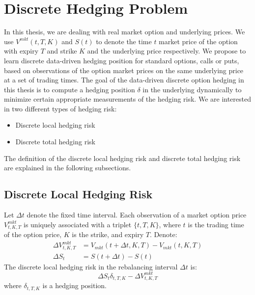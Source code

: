 \documentclass[letterpaper,12pt,titlepage,oneside,final]{book}
\numberwithin{equation}{section}
\theoremstyle{definition}
\newcommand{\DT}{\Delta t}
\newcommand{\Vmkt}{V^{mkt}}
\newcommand{\Smkt}{S}
\begin{document}
\section{Discrete Hedging Problem}
\label{sec:DiscreteHedgingCriteria}
In this thesis, we are dealing with real market option and underlying prices.  We use  $\Vmkt(t,T,K)$ and $\Smkt(t)$ to denote the time $t$ market price of the option with expiry $T$ and strike $K$ and the underlying price respectively. We propose to learn discrete data-driven hedging position for standard options, calls or puts, based on observations of the option market prices on the same underlying price at a set of trading times.
The goal of the data-driven discrete option hedging in this thesis is to compute a hedging position $\delta$ in the underlying dynamically to minimize certain appropriate measurements of the hedging risk. We are interested in two different types of hedging risk:
\begin{itemize}
   \item  Discrete local hedging risk
   \item  Discrete total hedging risk
\end{itemize}
The definition of the discrete local hedging risk and discrete total hedging risk are explained in the following subsections.

\subsection{Discrete Local Hedging Risk}
\label{sec:DiscreteLocalRisk}
 Let $\DT$ denote the fixed  time interval.
Each observation of a market option price  $V^{mkt}_{t,K,T}$ is uniquely associated with a triplet $\{t,T,K\}$, where $t$ is the trading time of the option price,  $K$ is the strike, and expiry $T$.
  Denote:
\begin{equation}
\begin{split}
\Delta V^{mkt}_{t,K,T}& =V_{mkt}(t+\Delta t,K,T)-V_{mkt}(t,K,T)\\
\Delta \Smkt_{t} &=\Smkt(t+\DT)-\Smkt(t)
\end{split}
\label{eq:DVDS}
\end{equation}
The discrete local hedging risk in the rebalancing interval $\DT$ is:
\begin{equation}
\Delta \Smkt_{t}\delta_{t,T,K} -\Delta V^{mkt}_{t,K,T}
\label{eq:local}
\end{equation}
where $\delta_{t,T,K}$ is a hedging position.
\end{document}
